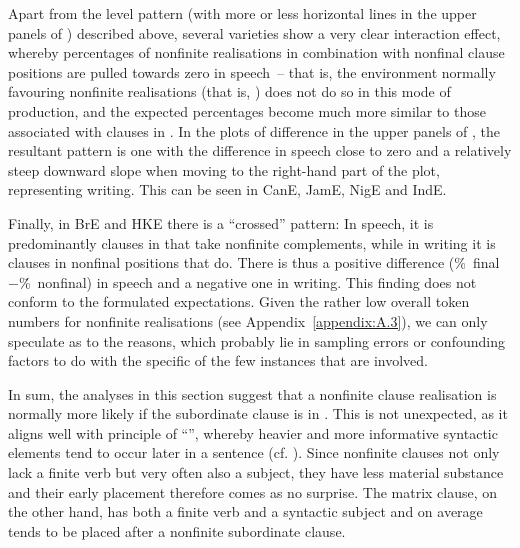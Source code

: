 Apart from the level pattern (with more or less horizontal lines in the upper panels of ) described above, several varieties show a very clear interaction effect, whereby percentages of nonfinite realisations in combination with nonfinal clause positions are pulled towards zero in speech~– that is, the environment normally favouring nonfinite realisations (that is, ) does not do so in this mode of production, and the expected percentages become much more similar to those associated with clauses in . In the plots of difference in the upper panels of , the resultant pattern is one with the difference in speech close to zero and a relatively steep downward slope when moving to the right-hand part of the plot, representing writing. This can be seen in CanE, JamE, NigE and IndE.

Finally, in BrE and HKE there is a “crossed” pattern: In speech, it is predominantly clauses in  that take nonfinite complements, while in writing it is clauses in nonfinal positions that do. There is thus a positive difference (\%~final\,$-$\.\%~nonfinal) in speech and a negative one in writing. This finding does not conform to the formulated expectations. Given the rather low overall token numbers for nonfinite realisations (see Appendix~\ref{appendix:A.3}), we can only speculate as to the reasons, which probably lie in sampling errors or confounding factors to do with the specific  of the few instances that are involved.

In sum, the analyses in this section suggest that a nonfinite clause realisation is normally more likely if the subordinate clause is in . This is not unexpected, as it aligns well with  principle of “”, whereby heavier and more informative syntactic elements tend to occur later in a sentence (cf. ). Since nonfinite clauses not only lack a finite verb but very often also a subject, they have less material substance and their early placement therefore comes as no surprise. The matrix clause, on the other hand, has both a finite verb and a syntactic subject and on average tends to be placed after a nonfinite subordinate clause.

